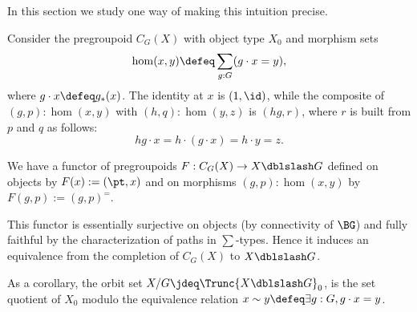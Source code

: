In this section we study one way of making this intuition precise.

Consider the pregroupoid $C_G(X)$ with object type $X_0$ and morphism sets
\[
  \hom(x,y) \defeq \sum_{g:G}(g\cdot x = y),
\]
where $g\cdot x \defeq g_*(x)$. The identity at $x$ is
$(1,\id)$, while the composite of $(g,p):\hom(x,y)$ with
$(h,q):\hom(y,z)$ is $(hg,r)$, where $r$ is built from $p$ and $q$ as
follows:
\[
  hg \cdot x = h\cdot(g\cdot x) = h\cdot y = z.
\]

We have a functor of pregroupoids $F: C_G(X) \to X \dblslash G$
defined on objects by
$F(x) := (\pt,x)$ and on morphisms $(g,p):\hom(x,y)$ by $F(g,p) :=
(g,p)^=$.

This functor is essentially surjective on objects (by connectivity of
$\BG$) and fully faithful by the characterization of paths in
$\sum$-types. Hence it induces an equivalence from the completion of
$C_G(X)$ to $X\dblslash G$.

As a corollary, the orbit set $X/G \jdeq \Trunc{X \dblslash G}_0$,
is the set quotient of $X_0$ modulo the equivalence relation
$x \sim y \defeq \exists g:G, g\cdot x = y$.


